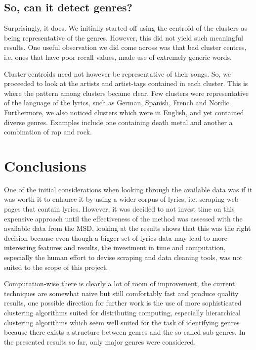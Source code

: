 \documentclass[10pt,a4paper, twocolumn]{article}
\begin{document}
   \subsection{So, can it detect genres?}
  Surprisingly, it does.
  We initially started off using the centroid of the clusters as being representative of the genres.
  However, this did not yield such meaningful results.
  One useful observation we did come across was that bad cluster centres, i.e, ones that have poor recall values, made use of extremely generic words.
  
  Cluster centroids need not however be representative of their songs.
  So, we proceeded to look at the artists and artist-tags contained in each cluster.
  This is where the pattern among clusters became clear.
  Few clusters were representative of the language of the lyrics, such as German, Spanish, French and Nordic.
  Furthermore, we also noticed clusters which were in English, and yet contained diverse genres.
  Examples include one containing death metal and another a combination of rap and rock.
  
  \section{Conclusions}
  One of the initial considerations when looking through the available data was if it was
  worth it to enhance it by using a wider corpus of lyrics, i.e. scraping web pages that
  contain lyrics. However, it was decided to not invest time on this expensive approach
  until the effectiveness of the method was assessed with the available data from the
  MSD, looking at the results shows that this was the right decision because even though
  a bigger set of lyrics data may lead to more interesting features and results, the
  investment in time and computation, especially the human effort to devise scraping and
  data cleaning tools, was not suited to the scope of this project.
  
  Computation-wise there is clearly a lot of room of improvement, the current techniques
  are somewhat naive but still comfortably fast and produce quality results, one
  possible direction for further work is the use of more sophisticated clustering
  algorithms suited for distributing computing, especially hierarchical clustering
  algorithms which seem well suited for the task of identifying genres because there
  exists a structure between genres and the so-called sub-genres. In the presented
  results so far, only major genres were considered.
  
\end{document}
